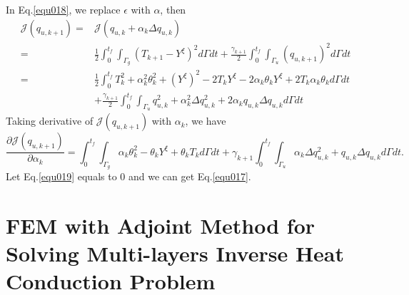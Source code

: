 \documentclass[UTF-8]{article}
\begin{document}
In Eq.\ref{equ018}, we replace $\epsilon$ with $\alpha$, then
\begin{align*}
	\mathcal{J}(q_{u,k+1}) =& \mathcal{J}(q_{u,k} + \alpha_k \Delta q_{u,k}) \nonumber \\
	=& \frac{1}{2} \int_{0}^{t_f} \int_{\Gamma_g} (T_{k+1} - Y^\xi)^2 d\Gamma dt + \frac{\gamma_{k+1}}{2} \int_{0}^{t_f} \int_{\Gamma_u} (q_{u,k+1})^2 d\Gamma dt \nonumber \\
	=& \frac{1}{2} \int_{0}^{t_f} T_k^2 + \alpha_k^2 \theta_k^2 + (Y^\xi)^2 - 2T_k Y^\xi - 2 \alpha_k \theta_k Y^\xi + 2 T_k \alpha_k \theta_k d\Gamma dt \nonumber \\
	& + \frac{\gamma_{k+1}}{2} \int_{0}^{t_f} \int_{\Gamma_u} q_{u,k}^2 + \alpha_k^2 \Delta q_{u,k}^2 + 2 \alpha _k q_{u,k} \Delta q_{u,k} d\Gamma dt
\end{align*}
Taking derivative of $\mathcal{J}(q_{u,k+1})$ with $\alpha_k$, we have
\begin{equation}\label{equ019}
	\frac{\partial \mathcal{J}(q_{u,k+1})}{\partial \alpha_k} = \int_{0}^{t_f}\int_{\Gamma_g} \alpha_k \theta_k^2 - \theta_k Y^\xi + \theta_k T_k d\Gamma dt + \gamma_{k+1} \int_{0}^{t_f} \int_{\Gamma_u} \alpha_k \Delta q_{u,k}^2 + q_{u,k} \Delta q_{u,k} d\Gamma dt.
\end{equation}
Let Eq.\ref{equ019} equals to $0$ and we can get Eq.\ref{equ017}.

\section{FEM with Adjoint Method for Solving Multi-layers Inverse Heat Conduction Problem}
\end{document}
